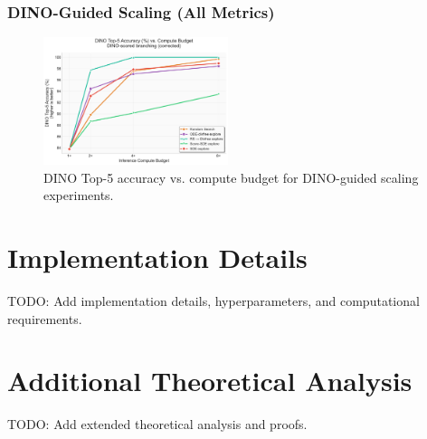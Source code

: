 \documentclass{article}
\begin{document}
\subsubsection{DINO-Guided Scaling (All Metrics)}

\begin{figure}[H]
  \centering
  \includegraphics[width=0.48\textwidth]{figures/scaling_dino_top5.pdf}
  \caption{DINO Top-5 accuracy vs. compute budget for DINO-guided scaling experiments.}
  \label{fig:dino-scaling-complete}
\end{figure}

\section{Implementation Details}

TODO: Add implementation details, hyperparameters, and computational requirements.

\section{Additional Theoretical Analysis}

TODO: Add extended theoretical analysis and proofs.

\end{document}
